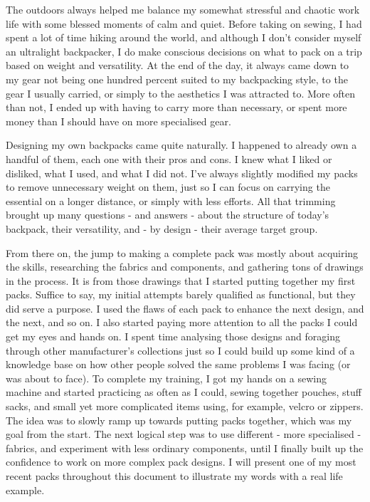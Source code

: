 The outdoors always helped me balance my somewhat stressful and chaotic work life with some blessed moments of calm and quiet. Before taking on sewing, I had spent a lot of time hiking around the world, and although I don't consider myself an ultralight backpacker, I do make conscious decisions on what to pack on a trip based on weight and versatility. At the end of the day, it always came down to my gear not being one hundred percent suited to my backpacking style, to the gear I usually carried, or simply to the aesthetics I was attracted to. More often than not, I ended up with having to carry more than necessary, or spent more money than I should have on more specialised gear.

Designing my own backpacks came quite naturally. I happened to already own a handful of them, each one with their pros and cons. I knew what I liked or disliked, what I used, and what I did not. I've always slightly modified my packs to remove unnecessary weight on them, just so I can focus on carrying the essential on a longer distance, or simply with less efforts. All that trimming brought up many questions - and answers - about the structure of today's backpack, their versatility, and - by design - their average target group.

From there on, the jump to making a complete pack was mostly about acquiring the skills, researching the fabrics and components, and gathering tons of drawings in the process. It is from those drawings that I started putting together my first packs. Suffice to say, my initial attempts barely qualified as functional, but they did serve a purpose. I used the flaws of each pack to enhance the next design, and the next, and so on. I also started paying more attention to all the packs I could get my eyes and hands on. I spent time analysing those designs and foraging through other manufacturer's collections just so I could build up some kind of a knowledge base on how other people solved the same problems I was facing (or was about to face). To complete my training, I got my hands on a sewing machine and started practicing as often as I could, sewing together pouches, stuff sacks, and small yet more complicated items using, for example, velcro or zippers. The idea was to slowly ramp up towards putting packs together, which was my goal from the start. The next logical step was to use different - more specialised - fabrics, and experiment with less ordinary components, until I finally built up the confidence to work on more complex pack designs. I will present one of my most recent packs throughout this document to illustrate my words with a real life example.

